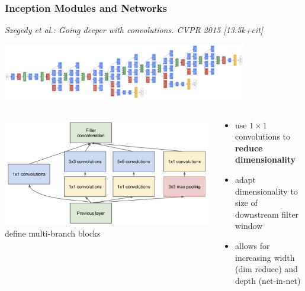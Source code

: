 \documentclass[compress]{beamer}
\newcommand{\textbblue}[1]{{\bf\color{Blue} #1}}
\newcommand{\is}[1]{\setlength{\itemsep}{#1}}
\begin{document}
\begin{frame} \frametitle{Inception Modules and Networks}
{\small \textit{Szegedy et al.: Going deeper with convolutions. CVPR 2015 [13.5k+cit]}}

\begin{center}
\includegraphics[width=0.8\textwidth]{./figures/inception-network.png}
\end{center}

\begin{columns}
\begin{column}{0.4\textwidth}
\includegraphics[width=1.11\textwidth]{./figures/inception-module.png}\\
define multi-branch blocks
\end{column}
\begin{column}{0.55\textwidth}
\begin{itemize} \is{2mm}
\item use $1\times 1$ convolutions to \textbblue{reduce dimensionality}
\item adapt dimensionality to size of downstream filter window
\item allows for increasing width (dim reduce) and depth (net-in-net)
\end{itemize}
\end{column}
\end{columns}
\end{frame}
\end{document}
